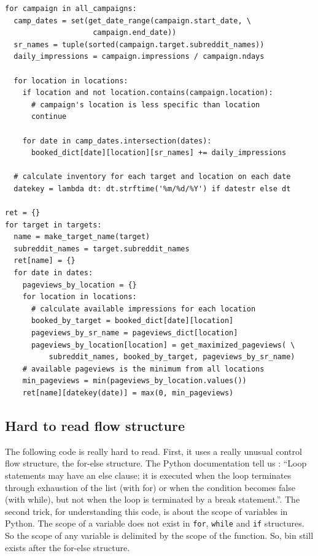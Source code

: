 \documentclass[11pt, a4paper]{article}
\begin{document}
\begin{lstlisting}[caption=\texttt{r2/lib/inventory.py} at lines 261-292]
for campaign in all_campaigns:
  camp_dates = set(get_date_range(campaign.start_date, \
					campaign.end_date))
  sr_names = tuple(sorted(campaign.target.subreddit_names))
  daily_impressions = campaign.impressions / campaign.ndays

  for location in locations:
    if location and not location.contains(campaign.location):
      # campaign's location is less specific than location
      continue

    for date in camp_dates.intersection(dates):
      booked_dict[date][location][sr_names] += daily_impressions

  # calculate inventory for each target and location on each date
  datekey = lambda dt: dt.strftime('%m/%d/%Y') if datestr else dt

ret = {}
for target in targets:
  name = make_target_name(target)
  subreddit_names = target.subreddit_names
  ret[name] = {}
  for date in dates:
    pageviews_by_location = {}
    for location in locations:
      # calculate available impressions for each location
      booked_by_target = booked_dict[date][location]
      pageviews_by_sr_name = pageviews_dict[location]
      pageviews_by_location[location] = get_maximized_pageviews( \
          subreddit_names, booked_by_target, pageviews_by_sr_name)
    # available pageviews is the minimum from all locations
    min_pageviews = min(pageviews_by_location.values())
    ret[name][datekey(date)] = max(0, min_pageviews)
\end{lstlisting}

\newpage 
\subsection{Hard to read flow structure}

The following code is really hard to read. First, it uses a really unusual control flow structure, the for-else structure. The Python documentation tell us : \enquote{Loop statements may have an else clause; it is executed when the loop terminates through exhaustion of the list (with for) or when the condition becomes false (with while), but not when the loop is terminated by a break statement.}. The second trick, for understanding this code, is about the scope of variables in Python. The scope of a variable does not exist in \texttt{for}, \texttt{while} and \texttt{if} structures. So the scope of any variable is delimited by the scope of the function. So, bin still exists after the for-else structure. 
\end{document}
